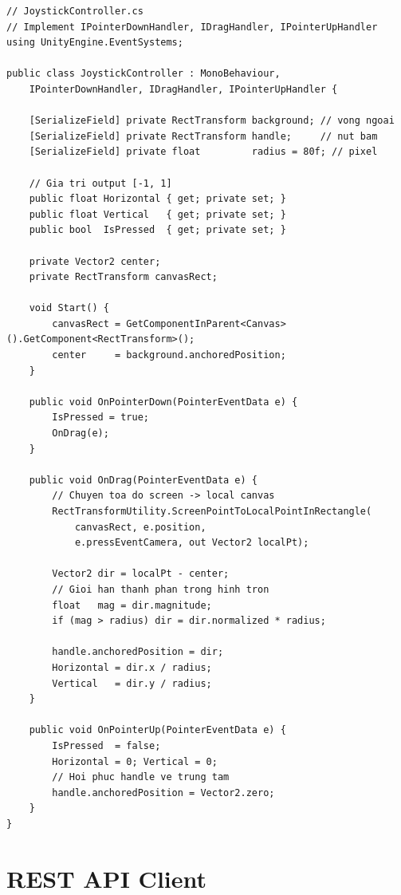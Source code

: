 \documentclass[12pt,a4paper]{report}
\begin{document}
\begin{lstlisting}[style=bashStyle, caption={JoystickController --- virtual joystick cho màn hình cảm ứng}, label={lst:joystick}]
// JoystickController.cs
// Implement IPointerDownHandler, IDragHandler, IPointerUpHandler
using UnityEngine.EventSystems;

public class JoystickController : MonoBehaviour,
    IPointerDownHandler, IDragHandler, IPointerUpHandler {

    [SerializeField] private RectTransform background; // vong ngoai
    [SerializeField] private RectTransform handle;     // nut bam
    [SerializeField] private float         radius = 80f; // pixel

    // Gia tri output [-1, 1]
    public float Horizontal { get; private set; }
    public float Vertical   { get; private set; }
    public bool  IsPressed  { get; private set; }

    private Vector2 center;
    private RectTransform canvasRect;

    void Start() {
        canvasRect = GetComponentInParent<Canvas>().GetComponent<RectTransform>();
        center     = background.anchoredPosition;
    }

    public void OnPointerDown(PointerEventData e) {
        IsPressed = true;
        OnDrag(e);
    }

    public void OnDrag(PointerEventData e) {
        // Chuyen toa do screen -> local canvas
        RectTransformUtility.ScreenPointToLocalPointInRectangle(
            canvasRect, e.position,
            e.pressEventCamera, out Vector2 localPt);

        Vector2 dir = localPt - center;
        // Gioi han thanh phan trong hinh tron
        float   mag = dir.magnitude;
        if (mag > radius) dir = dir.normalized * radius;

        handle.anchoredPosition = dir;
        Horizontal = dir.x / radius;
        Vertical   = dir.y / radius;
    }

    public void OnPointerUp(PointerEventData e) {
        IsPressed  = false;
        Horizontal = 0; Vertical = 0;
        // Hoi phuc handle ve trung tam
        handle.anchoredPosition = Vector2.zero;
    }
}
\end{lstlisting}

\section{REST API Client}
\end{document}
